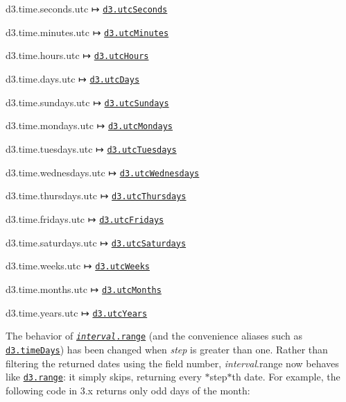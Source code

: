 \begin{DoxyItemize}
\item d3.\+time.\+seconds.\+utc ↦ \href{https://github.com/d3/d3-time/blob/master/README.md#utcSeconds}{\tt d3.\+utc\+Seconds}
\item d3.\+time.\+minutes.\+utc ↦ \href{https://github.com/d3/d3-time/blob/master/README.md#utcMinutes}{\tt d3.\+utc\+Minutes}
\item d3.\+time.\+hours.\+utc ↦ \href{https://github.com/d3/d3-time/blob/master/README.md#utcHours}{\tt d3.\+utc\+Hours}
\item d3.\+time.\+days.\+utc ↦ \href{https://github.com/d3/d3-time/blob/master/README.md#utcDays}{\tt d3.\+utc\+Days}
\item d3.\+time.\+sundays.\+utc ↦ \href{https://github.com/d3/d3-time/blob/master/README.md#utcSundays}{\tt d3.\+utc\+Sundays}
\item d3.\+time.\+mondays.\+utc ↦ \href{https://github.com/d3/d3-time/blob/master/README.md#utcMondays}{\tt d3.\+utc\+Mondays}
\item d3.\+time.\+tuesdays.\+utc ↦ \href{https://github.com/d3/d3-time/blob/master/README.md#utcTuesdays}{\tt d3.\+utc\+Tuesdays}
\item d3.\+time.\+wednesdays.\+utc ↦ \href{https://github.com/d3/d3-time/blob/master/README.md#utcWednesdays}{\tt d3.\+utc\+Wednesdays}
\item d3.\+time.\+thursdays.\+utc ↦ \href{https://github.com/d3/d3-time/blob/master/README.md#utcThursdays}{\tt d3.\+utc\+Thursdays}
\item d3.\+time.\+fridays.\+utc ↦ \href{https://github.com/d3/d3-time/blob/master/README.md#utcFridays}{\tt d3.\+utc\+Fridays}
\item d3.\+time.\+saturdays.\+utc ↦ \href{https://github.com/d3/d3-time/blob/master/README.md#utcSaturdays}{\tt d3.\+utc\+Saturdays}
\item d3.\+time.\+weeks.\+utc ↦ \href{https://github.com/d3/d3-time/blob/master/README.md#utcWeeks}{\tt d3.\+utc\+Weeks}
\item d3.\+time.\+months.\+utc ↦ \href{https://github.com/d3/d3-time/blob/master/README.md#utcMonths}{\tt d3.\+utc\+Months}
\item d3.\+time.\+years.\+utc ↦ \href{https://github.com/d3/d3-time/blob/master/README.md#utcYears}{\tt d3.\+utc\+Years}
\end{DoxyItemize}

The behavior of \href{https://github.com/d3/d3-time/blob/master/README.md#interval_range}{\tt {\itshape interval}.range} (and the convenience aliases such as \href{https://github.com/d3/d3-time/blob/master/README.md#timeDays}{\tt d3.\+time\+Days}) has been changed when {\itshape step} is greater than one. Rather than filtering the returned dates using the field number, {\itshape interval}.range now behaves like \href{https://github.com/d3/d3-array/blob/master/README.md#range}{\tt d3.\+range}\+: it simply skips, returning every $\ast$step$\ast$th date. For example, the following code in 3.\+x returns only odd days of the month\+:


